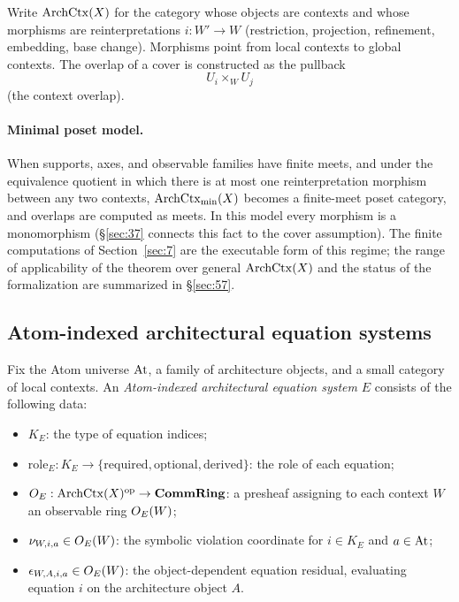 \begin{definition}\label{def:contextcategory}
Write $\mathrm{ArchCtx}(X)$ for the category whose objects are contexts and whose
morphisms are reinterpretations $i:W'\to W$ (restriction, projection,
refinement, embedding, base change). Morphisms point from local contexts
to global contexts. The overlap of a cover is constructed as the pullback
\[
U_i\times_W U_j
\]
(the context overlap).
\end{definition}

\paragraph{Minimal poset model.}
When supports, axes, and observable families have finite meets, and under
the equivalence quotient in which there is at most one reinterpretation
morphism between any two contexts, $\mathrm{ArchCtx}_{\min}(X)$ becomes a
finite-meet poset category, and overlaps are computed as meets. In this
model every morphism is a monomorphism (\S\ref{sec:37} connects this fact
to the cover assumption). The finite computations of Section~\ref{sec:7}
are the executable form of this regime; the range of applicability of the
theorem over general $\mathrm{ArchCtx}(X)$ and the status of the formalization
are summarized in \S\ref{sec:57}.

\subsection{Atom-indexed architectural equation systems}\label{sec:34}

\begin{definition}\label{def:equationsystem}
Fix the Atom universe $\mathrm{At}$, a family of architecture objects, and a
small category of local contexts. An \emph{Atom-indexed architectural
equation system} $E$ consists of the following data:
\begin{itemize}
\item $K_E$: the type of equation indices;
\item $\mathrm{role}_E : K_E \to \{\mathrm{required}, \mathrm{optional},
      \mathrm{derived}\}$: the role of each equation;
\item $O_{E} : \mathrm{ArchCtx}(X)^{\mathrm{op}} \to \mathbf{CommRing}$: a
      presheaf assigning to each context $W$ an observable ring
      $O_{E}(W)$;
\item $\nu_{W,i,a} \in O_{E}(W)$: the symbolic violation coordinate for
      $i \in K_E$ and $a \in \mathrm{At}$;
\item $\epsilon_{W,A,i,a} \in O_{E}(W)$: the object-dependent equation
      residual, evaluating equation $i$ on the architecture object $A$.
\end{itemize}
\end{definition}

